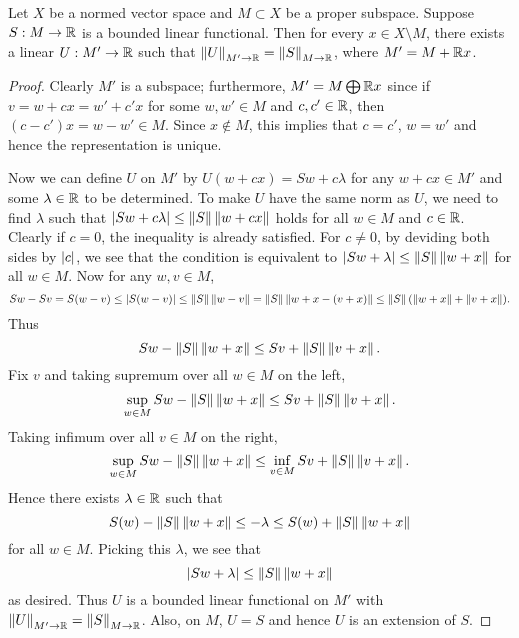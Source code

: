 \begin{lemma}\label{lem:h_b}
    Let $X$ be a normed vector space and $M\subset X$ be a 
    proper subspace. Suppose $S:M\to\mathbb{R}$ is a bounded linear 
    functional. Then for every $x\in X\setminus M$, there 
    exists a linear $U:M'\to\mathbb{R}$ such that $\left\lVert {U} \right\rVert_{M'\to\mathbb{R}} 
    = \left\lVert {S} \right\rVert_{M\to\mathbb{R}}$, where $M' = M + \mathbb{R} x$.
\end{lemma}
\begin{proof}
    Clearly $M'$ is a subspace; furthermore, $M' = M\bigoplus\mathbb{R} x$ 
    since if $v = w + cx = w' + c'x$ for some $w,w'\in M$ and 
    $c,c'\in\mathbb{R}$, then $(c-c')x = w-w' \in M$. Since $x\not\in M$, 
    this implies that $c = c'$, $w = w'$ and hence the 
    representation is unique. 

    Now we can define $U$ on $M'$ by $U(w+cx) = Sw + c\lambda$ 
    for any $w+cx\in M'$ and some $\lambda\in\mathbb{R}$ to be determined. 
    To make $U$ have the same norm as $U$, we need to find $\lambda$ 
    such that $\left\lvert {Sw+c\lambda} \right\rvert\leq\left\lVert {S} \right\rVert\left\lVert {w+cx} \right\rVert$ holds for all 
    $w\in M$ and $c\in\mathbb{R}$. Clearly if $c=0$, the inequality is 
    already satisfied. For $c\neq 0$, by deviding both sides by 
    $\left\lvert {c} \right\rvert$, we see that the condition is equivalent to 
    $\left\lvert {Sw + \lambda} \right\rvert\leq\left\lVert {S} \right\rVert\left\lVert {w+x} \right\rVert$ for all $w\in M$. Now 
    for any $w,v\in M$, 
    \begin{equation*}
        Sw - Sv = S(w-v) \leq \left\lvert {S(w-v)} \right\rvert \leq \left\lVert {S} \right\rVert\left\lVert {w-v} \right\rVert 
        = \left\lVert {S} \right\rVert\left\lVert {w+x-(v+x)} \right\rVert \leq \left\lVert {S} \right\rVert(\left\lVert {w+x} \right\rVert+\left\lVert {v+x} \right\rVert).
    \end{equation*}
    Thus 
    \begin{equation*}
        Sw - \left\lVert {S} \right\rVert\left\lVert {w+x} \right\rVert \leq Sv + \left\lVert {S} \right\rVert\left\lVert {v+x} \right\rVert.
    \end{equation*} 
    Fix $v$ and taking supremum over all $w\in M$ on the left, 
    \begin{equation*}
        \sup_{w\in M} Sw - \left\lVert {S} \right\rVert\left\lVert {w+x} \right\rVert \leq Sv + \left\lVert {S} \right\rVert\left\lVert {v+x} \right\rVert.
    \end{equation*}
    Taking infimum over all $v\in M$ on the right, 
    \begin{equation*}
        \sup_{w\in M} Sw - \left\lVert {S} \right\rVert\left\lVert {w+x} \right\rVert \leq \inf_{v\in M} Sv + \left\lVert {S} \right\rVert\left\lVert {v+x} \right\rVert.
    \end{equation*}
    Hence there exists $\lambda\in\mathbb{R}$ such that 
    \begin{equation*}
        S(w) - \left\lVert {S} \right\rVert\left\lVert {w+x} \right\rVert \leq -\lambda \leq S(w) + \left\lVert {S} \right\rVert\left\lVert {w+x} \right\rVert
    \end{equation*}
    for all $w\in M$. Picking this $\lambda$, we see that 
    \begin{equation*}
        \left\lvert {Sw + \lambda} \right\rvert \leq \left\lVert {S} \right\rVert\left\lVert {w+x} \right\rVert
    \end{equation*}
    as desired. Thus $U$ is a bounded linear functional on $M'$ 
    with $\left\lVert {U} \right\rVert_{M'\to\mathbb{R}} = \left\lVert {S} \right\rVert_{M\to\mathbb{R}}$. Also, on $M$, 
    $U = S$ and hence $U$ is an extension of $S$.  
\end{proof}

